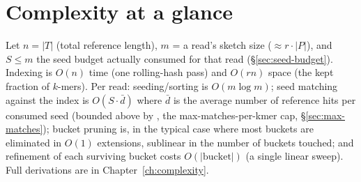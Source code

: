 \section{Complexity at a glance}

Let $n = |T|$ (total reference length), $m$ = a read's sketch size ($\approx r\cdot|P|$), and $S
\le m$ the seed budget actually consumed for that read (\S\ref{sec:seed-budget}). Indexing is
$O(n)$ time (one rolling-hash pass) and $O(rn)$ space (the kept fraction of $k$-mers). Per read:
seeding/sorting is $O(m\log m)$; seed matching against the index is $O(S \cdot \bar d)$ where
$\bar d$ is the average number of reference hits per consumed seed (bounded above by ,
the max-matches-per-kmer cap, \S\ref{sec:max-matches}); bucket pruning is, in the typical case
where most buckets are eliminated in $O(1)$ extensions, sublinear in the number of buckets touched;
and refinement of each surviving bucket costs $O(|\text{bucket}|)$ (a single linear sweep). Full
derivations are in Chapter~\ref{ch:complexity}.
